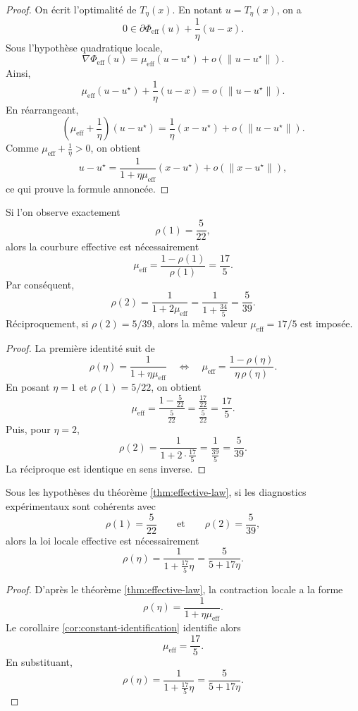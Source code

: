 \begin{proof}
On écrit l'optimalité de $T_\eta(x)$. En notant $u=T_\eta(x)$, on a
\[
0 \in \partial \Phi_{\mathrm{eff}}(u)+\frac{1}{\eta}(u-x).
\]
Sous l'hypothèse quadratique locale,
\[
\nabla \Phi_{\mathrm{eff}}(u)=\mu_{\mathrm{eff}}(u-u^\star)+o(\|u-u^\star\|).
\]
Ainsi,
\[
\mu_{\mathrm{eff}}(u-u^\star)+\frac{1}{\eta}(u-x)
=
o(\|u-u^\star\|).
\]
En réarrangeant,
\[
\left(\mu_{\mathrm{eff}}+\frac{1}{\eta}\right)(u-u^\star)
=
\frac{1}{\eta}(x-u^\star)
+
o(\|u-u^\star\|).
\]
Comme $\mu_{\mathrm{eff}}+\frac{1}{\eta}>0$, on obtient
\[
u-u^\star
=
\frac{1}{1+\eta\mu_{\mathrm{eff}}}(x-u^\star)
+
o\!\left(\|x-u^\star\|\right),
\]
ce qui prouve la formule annoncée.
\end{proof}

\begin{corollary}
\label{cor:constant-identification}
Si l'on observe exactement
\[
\rho(1)=\frac{5}{22},
\]
alors la courbure effective est nécessairement
\[
\mu_{\mathrm{eff}}
=
\frac{1-\rho(1)}{\rho(1)}
=
\frac{17}{5}.
\]
Par conséquent,
\[
\rho(2)
=
\frac{1}{1+2\mu_{\mathrm{eff}}}
=
\frac{1}{1+\frac{34}{5}}
=
\frac{5}{39}.
\]
Réciproquement, si $\rho(2)=5/39$, alors la même valeur $\mu_{\mathrm{eff}}=17/5$ est imposée.
\end{corollary}

\begin{proof}
La première identité suit de
\[
\rho(\eta)=\frac{1}{1+\eta\mu_{\mathrm{eff}}}
\quad\Longleftrightarrow\quad
\mu_{\mathrm{eff}}
=
\frac{1-\rho(\eta)}{\eta\,\rho(\eta)}.
\]
En posant $\eta=1$ et $\rho(1)=5/22$, on obtient
\[
\mu_{\mathrm{eff}}
=
\frac{1-\frac{5}{22}}{\frac{5}{22}}
=
\frac{\frac{17}{22}}{\frac{5}{22}}
=
\frac{17}{5}.
\]
Puis, pour $\eta=2$,
\[
\rho(2)
=
\frac{1}{1+2\cdot \frac{17}{5}}
=
\frac{1}{\frac{39}{5}}
=
\frac{5}{39}.
\]
La réciproque est identique en sens inverse.
\end{proof}

\begin{proposition}
\label{prop:closed-law}
Sous les hypothèses du théorème \ref{thm:effective-law}, si les diagnostics expérimentaux sont cohérents avec
\[
\rho(1)=\frac{5}{22}
\qquad\text{et}\qquad
\rho(2)=\frac{5}{39},
\]
alors la loi locale effective est nécessairement
\[
\rho(\eta)=\frac{1}{1+\frac{17}{5}\eta}
=
\frac{5}{5+17\eta}.
\]
\end{proposition}

\begin{proof}
D'après le théorème \ref{thm:effective-law}, la contraction locale a la forme
\[
\rho(\eta)=\frac{1}{1+\eta\mu_{\mathrm{eff}}}.
\]
Le corollaire \ref{cor:constant-identification} identifie alors
\[
\mu_{\mathrm{eff}}=\frac{17}{5}.
\]
En substituant,
\[
\rho(\eta)=\frac{1}{1+\frac{17}{5}\eta}
=
\frac{5}{5+17\eta}.
\]
\end{proof}

